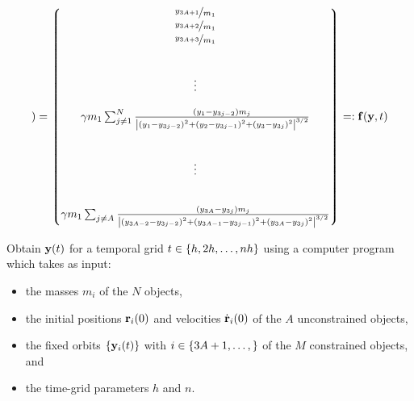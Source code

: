 \documentclass[]{article}
\begin{document}
\begin{align}
    )
    =
    \mqty*(
    \nicefrac{y_{3A+1}}{m_1}\\
    \nicefrac{y_{3A+2}}{m_1}\\
    \nicefrac{y_{3A+3}}{m_1}\\  
    \\
    \\
    \vdots\\
    \\
    \gamma m_1\sum_{j\neq 1}^N\frac{\qty(y_{1}-y_{3j-2})m_j}{\vqty{\qty(y_{1}-y_{3j-2})^2+\qty(y_{2}-y_{3j-1})^2+\qty(y_{3}-y_{3j})^2}^{3/2}}\\
    \\
    \\
    \vdots\\
    \\
    \\
    \gamma m_1\sum_{j\neq A}\frac{\qty(y_{3A}-y_{3j})m_j}{\vqty{\qty(y_{3A-2}-y_{3j-2})^2+\qty(y_{3A-1}-y_{3j-1})^2+\qty(y_{3A}-y_{3j})^2}^{3/2}}\\
    )
    =:
    \vb{f}\qty(\vb{y},t)
\end{align}

\begin{bclogo}[logo={\bccrayon},arrondi=0.1]{}
Obtain $\vb{y}(t)$ for a temporal grid $t\in\qty{h,2h,\ldots,nh}$
using a computer program which takes as input:
\begin{itemize}
    \item the masses $m_i$ of the $N$ objects,
    \item the initial positions $\vb{r}_i(0)$ and velocities $\dot{\vb{r}}_i(0)$ of the $A$ unconstrained objects,
    \item the fixed orbits $\qty{\vb{y}_i(t)}$ with $i\in\qty{3A+1,\ldots,}$ of the $M$ constrained objects, and
    \item the time-grid parameters $h$ and $n$.
\end{itemize}
\end{bclogo}

\newpage
\printnomenclature

\end{document}
